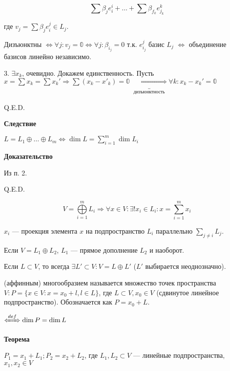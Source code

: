 \begin{enumerate}
          $$\sum\limits \beta_je_i^i + \ldots + \sum\limits \beta_{f_k} e_{j_k}^k$$

          где $v_j = \sum\limits \beta_j e_i^j \in L_j$.

          Дизъюнктны $\Leftrightarrow \forall j: v_j = \mathbb{0} \Leftrightarrow \forall j:  \beta_{i_j} = 0$ т.к. $e_{i_j}^j$ базис $L_j$ $\Leftrightarrow$ объединение базисов линейно независимо.

          3. $\exists x_k$, очевидно. Докажем единственность. Пусть $x = \sum x_k = \sum x_k' \Rightarrow \sum (x_k - x'_k) = \mathbb{0} \underbracket{\Leftrightarrow}_{\substack{\text{дизъюнктность}}}\forall k: x_k - x_k' = \mathbb{0} \quad$

\end{enumerate}

\hfill Q.E.D.

\textbf{Следствие}

\(L = L_1 \oplus \ldots \oplus L_m \Leftrightarrow \dim L = \sum\limits_{i = 1}^{m} \dim L_i\)

\textbf{Доказательство}

Из п. 2.

\hfill Q.E.D.

\[
    V = \bigoplus\limits_{i = 1}^{m} L_i \Rightarrow \forall x \in V: \exists! x_i \in L_i: x = \sum\limits_{i = 1}^{m} x_i
\]

\(x_i\) --- проекция элемента \(x\) на подпространство \(L_i\) параллельно \(\sum\limits_{j \neq i} L_j\).

Если $V = L_1 \oplus L_2$, \(L_1\) --- прямое дополнение $L_2$ и наоборот.

Если $L \subset V$, то всегда $\exists L' \subset V: V = L \oplus L'$ ($L'$ выбирается неоднозначно).

 (аффинным) многообразием называется множество точек пространства \(V: P = \{x \in V: x = x_0 + l, l \in L\}\), где \(L \subset V, x_0 \in V\) (сдвинутое линейное подпространство).  Обозначается как $P = x_0 + L$.

\(\defLeftrightarrow \dim P = \dim L\)

\textbf{Теорема}

\(P_1 = x_1 + L_1; P_2 = x_2 + L_2\), где \(L_1, L_2 \subset V\) --- линейные подпространства, \(x_1, x_2 \in V\)


